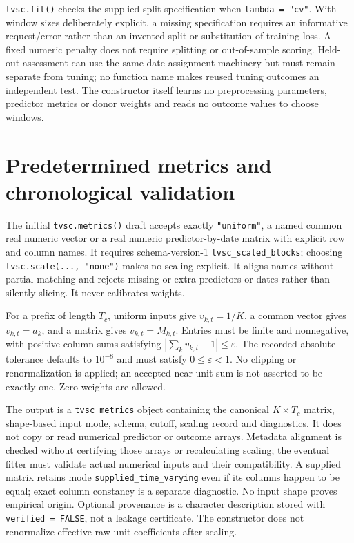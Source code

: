 \documentclass[11pt]{article}
\begin{document}
\texttt{tvsc.fit()} checks the supplied split specification when
\texttt{lambda = "cv"}. With window sizes deliberately explicit, a missing
specification requires an informative request/error rather than an
invented split or substitution of training loss. A fixed numeric penalty
does not require splitting or out-of-sample scoring. Held-out assessment
can use the same date-assignment machinery but must remain separate from
tuning; no function name makes reused tuning outcomes an independent test.
The constructor itself learns no preprocessing parameters, predictor
metrics or donor weights and reads no outcome values to choose windows.

\section{Predetermined metrics and chronological validation}
The initial \texttt{tvsc.metrics()} draft accepts exactly
\texttt{"uniform"}, a named common real numeric vector or a real numeric
predictor-by-date matrix with explicit row and column names. It requires
schema-version-1 \texttt{tvsc\_scaled\_blocks}; choosing
\texttt{tvsc.scale(..., "none")} makes no-scaling explicit. It aligns
names without partial matching and rejects missing or extra predictors
or dates rather than silently slicing. It never calibrates weights.

For a prefix of length $T_c$, uniform inputs give $v_{k,t}=1/K$, a common
vector gives $v_{k,t}=a_k$, and a matrix gives $v_{k,t}=M_{k,t}$. Entries
must be finite and nonnegative, with positive column sums satisfying
$|\sum_kv_{k,t}-1|\leq\varepsilon$. The recorded absolute tolerance
defaults to $10^{-8}$ and must satisfy $0\leq\varepsilon<1$.
No clipping or renormalization is applied; an accepted near-unit sum is
not asserted to be exactly one. Zero weights are allowed.

The output is a \texttt{tvsc\_metrics} object containing the canonical
$K\times T_c$ matrix, shape-based input mode, schema, cutoff, scaling
record and diagnostics. It does not copy or read numerical predictor or
outcome arrays. Metadata alignment is checked without certifying those
arrays or recalculating scaling; the eventual fitter must validate actual
numerical inputs and their compatibility. A supplied matrix retains mode
\texttt{supplied\_time\_varying} even if its columns happen to be equal;
exact column constancy is a separate diagnostic. No input shape proves
empirical origin. Optional provenance is a character description stored
with \texttt{verified = FALSE}, not a leakage certificate. The constructor
does not renormalize effective raw-unit coefficients after scaling.
\end{document}
